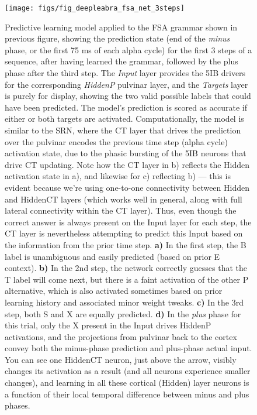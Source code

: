 \documentclass[11pt,twoside]{article}
\newif\myifpdf
\begin{document}
\begin{figure}
  \centering\texttt{[image: figs/fig\_deepleabra\_fsa\_net\_3steps]}
  \caption{\footnotesize Predictive learning model applied to the FSA grammar shown in previous figure, showing the prediction state (end of the {\em minus} phase, or the first 75 ms of each alpha cycle) for the first 3 steps of a sequence, after having learned the grammar, followed by the plus phase after the third step.  The {\em Input} layer provides the 5IB drivers for the corresponding {\em HiddenP} pulvinar layer, and the {\em Targets} layer is purely for display, showing the two valid possible labels that could have been predicted.  The model's prediction is scored as accurate if either or both targets are activated.  Computationally, the model is similar to the SRN, where the CT layer that drives the prediction over the pulvinar encodes the previous time step (alpha cycle) activation state, due to the phasic bursting of the 5IB neurons that drive CT updating.  Note how the CT layer in b) reflects the Hidden activation state in a), and likewise for c) reflecting b) --- this is evident because we're using one-to-one connectivity between Hidden and HiddenCT layers (which works well in general, along with full lateral connectivity within the CT layer).  Thus, even though the correct answer is always present on the Input layer for each step, the CT layer is nevertheless attempting to predict this Input based on the information from the prior time step.  {\bf a)} In the first step, the B label is unambiguous and easily predicted (based on prior E context). {\bf b)} In the 2nd step, the network correctly guesses that the T label will come next, but there is a faint activation of the other P alternative, which is also activated sometimes based on prior learning history and associated minor weight tweaks.  {\bf c)} In the 3rd step, both S and X are equally predicted.  {\bf d)} In the {\em plus} phase for this trial, only the X present in the Input  drives HiddenP activations, and the projections from pulvinar back to the cortex convey both the minus-phase prediction and plus-phase actual input.  You can see one HiddenCT neuron, just above the arrow, visibly changes its activation as a result (and all neurons experience smaller changes), and learning in all these cortical (Hidden) layer neurons is a function of their local temporal difference between minus and plus phases.}
  \label{fig.fsa_net}
\end{figure}
\end{document}
